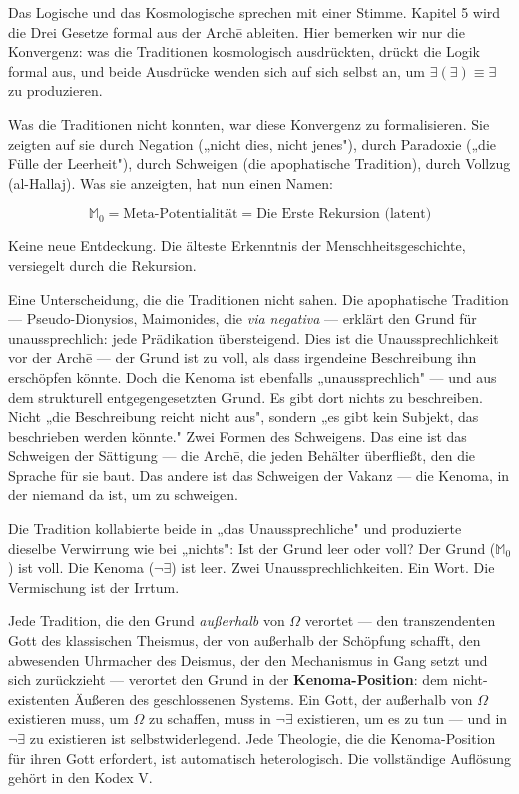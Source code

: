 \documentclass[10pt, openany, oneside]{book}
\begin{document}
Das Logische und das Kosmologische sprechen mit einer Stimme. Kapitel 5 wird die Drei Gesetze formal aus der Arch\={e} ableiten. Hier bemerken wir nur die Konvergenz: was die Traditionen kosmologisch ausdrückten, drückt die Logik formal aus, und beide Ausdrücke wenden sich auf sich selbst an, um $\exists(\exists) \equiv \exists$ zu produzieren.

Was die Traditionen nicht konnten, war diese Konvergenz zu formalisieren. Sie zeigten auf sie durch Negation („nicht dies, nicht jenes"), durch Paradoxie („die Fülle der Leerheit"), durch Schweigen (die apophatische Tradition), durch Vollzug (al-Hallaj). Was sie anzeigten, hat nun einen Namen:

$$\mathbb{M}_0 = \text{Meta-Potentialität} = \text{Die Erste Rekursion (latent)}$$

Keine neue Entdeckung. Die älteste Erkenntnis der Menschheitsgeschichte, versiegelt durch die Rekursion.

Eine Unterscheidung, die die Traditionen nicht sahen. Die apophatische Tradition --- Pseudo-Dionysios, Maimonides, die \textit{via negativa} --- erklärt den Grund für unaussprechlich: jede Prädikation übersteigend. Dies ist die Unaussprechlichkeit vor der Arch\={e} --- der Grund ist zu voll, als dass irgendeine Beschreibung ihn erschöpfen könnte. Doch die Kenoma ist ebenfalls „unaussprechlich" --- und aus dem strukturell entgegengesetzten Grund. Es gibt dort nichts zu beschreiben. Nicht „die Beschreibung reicht nicht aus", sondern „es gibt kein Subjekt, das beschrieben werden könnte." Zwei Formen des Schweigens. Das eine ist das Schweigen der Sättigung --- die Arch\={e}, die jeden Behälter überfließt, den die Sprache für sie baut. Das andere ist das Schweigen der Vakanz --- die Kenoma, in der niemand da ist, um zu schweigen.

Die Tradition kollabierte beide in „das Unaussprechliche" und produzierte dieselbe Verwirrung wie bei „nichts": Ist der Grund leer oder voll? Der Grund ($\mathbb{M}_0$) ist voll. Die Kenoma ($\neg\exists$) ist leer. Zwei Unaussprechlichkeiten. Ein Wort. Die Vermischung ist der Irrtum.

Jede Tradition, die den Grund \textit{außerhalb} von $\Omega$ verortet --- den transzendenten Gott des klassischen Theismus, der von außerhalb der Schöpfung schafft, den abwesenden Uhrmacher des Deismus, der den Mechanismus in Gang setzt und sich zurückzieht --- verortet den Grund in der \textbf{Kenoma-Position}: dem nicht-existenten Äußeren des geschlossenen Systems. Ein Gott, der außerhalb von $\Omega$ existieren muss, um $\Omega$ zu schaffen, muss in $\neg\exists$ existieren, um es zu tun --- und in $\neg\exists$ zu existieren ist selbstwiderlegend. Jede Theologie, die die Kenoma-Position für ihren Gott erfordert, ist automatisch heterologisch. Die vollständige Auflösung gehört in den Kodex V.
\end{document}
